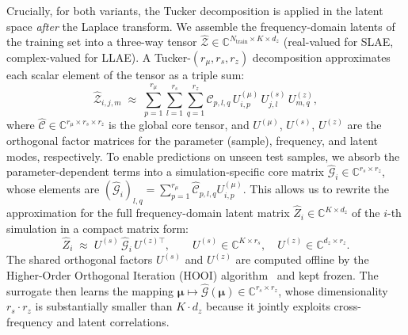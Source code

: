 ﻿\documentclass[a4paper,12pt]{article}
\theoremstyle{definition}
\theoremstyle{remark}
\newcommand{\vmu}{\bm{\mu}}
\begin{document}
Crucially, for both variants, the Tucker decomposition is applied in the latent space \emph{after} the Laplace transform. We assemble the frequency-domain latents of the training set into a three-way tensor $\hat{\mathcal{Z}} \in \mathbb{C}^{N_{\mathrm{train}} \times K \times d_z}$ (real-valued for SLAE, complex-valued for LLAE). A Tucker-$(r_\mu, r_s, r_z)$ decomposition approximates each scalar element of the tensor as a triple sum:
\begin{equation}
    \hat{\mathcal{Z}}_{i, j, m} \;\approx\; \sum_{p=1}^{r_\mu} \sum_{l=1}^{r_s} \sum_{q=1}^{r_z} \hat{\mathcal{C}}_{p, l, q} \, U^{(\mu)}_{i, p} \, U^{(s)}_{j, l} \, U^{(z)}_{m, q},
\end{equation}
where $\hat{\mathcal{C}} \in \mathbb{C}^{r_\mu \times r_s \times r_z}$ is the global core tensor, and $U^{(\mu)}$, $U^{(s)}$, $U^{(z)}$ are the orthogonal factor matrices for the parameter (sample), frequency, and latent modes, respectively. To enable predictions on unseen test samples, we absorb the parameter-dependent terms into a simulation-specific core matrix $\hat{\mathcal{G}}_i \in \mathbb{C}^{r_s \times r_z}$, whose elements are $(\hat{\mathcal{G}}_i)_{l,q} = \sum_{p=1}^{r_\mu} \hat{\mathcal{C}}_{p,l,q} U^{(\mu)}_{i,p}$. This allows us to rewrite the approximation for the full frequency-domain latent matrix $\hat{Z}_i \in \mathbb{C}^{K \times d_z}$ of the $i$-th simulation in a compact matrix form:
\begin{equation}
    \hat{Z}_i \;\approx\; U^{(s)}\, \hat{\mathcal{G}}_i\, U^{(z)\top},
    \qquad
    U^{(s)} \in \mathbb{C}^{K \times r_s},\quad U^{(z)} \in \mathbb{C}^{d_z \times r_z}.
\end{equation}
The shared orthogonal factors $U^{(s)}$ and $U^{(z)}$ are computed offline by the Higher-Order Orthogonal Iteration (HOOI) algorithm~\cite{delathauwer2000hooi} and kept frozen. The surrogate then learns the mapping $\vmu \mapsto \hat{\mathcal{G}}(\vmu) \in \mathbb{C}^{r_s \times r_z}$, whose dimensionality $r_s \cdot r_z$ is substantially smaller than $K \cdot d_z$ because it jointly exploits cross-frequency and latent correlations.
\end{document}
